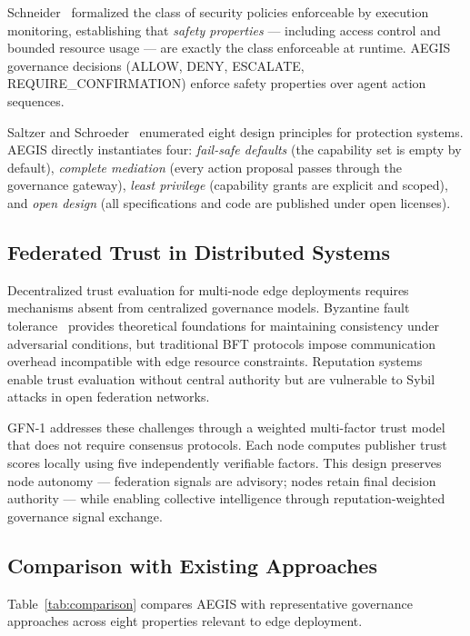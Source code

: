 \documentclass[journal]{IEEEtran}
\begin{document}
Schneider~\cite{schneider2000} formalized the class of security policies enforceable by execution monitoring, establishing that \textit{safety properties} --- including access control and bounded resource usage --- are exactly the class enforceable at runtime. AEGIS governance decisions (ALLOW, DENY, ESCALATE, REQUIRE\_CONFIRMATION) enforce safety properties over agent action sequences.

Saltzer and Schroeder~\cite{saltzer1975} enumerated eight design principles for protection systems. AEGIS directly instantiates four: \textit{fail-safe defaults} (the capability set is empty by default), \textit{complete mediation} (every action proposal passes through the governance gateway), \textit{least privilege} (capability grants are explicit and scoped), and \textit{open design} (all specifications and code are published under open licenses).

\subsection{Federated Trust in Distributed Systems}

Decentralized trust evaluation for multi-node edge deployments requires mechanisms absent from centralized governance models. Byzantine fault tolerance~\cite{castro1999} provides theoretical foundations for maintaining consistency under adversarial conditions, but traditional BFT protocols impose communication overhead incompatible with edge resource constraints. Reputation systems~\cite{josang2007} enable trust evaluation without central authority but are vulnerable to Sybil attacks in open federation networks.

GFN-1 addresses these challenges through a weighted multi-factor trust model that does not require consensus protocols. Each node computes publisher trust scores locally using five independently verifiable factors. This design preserves node autonomy --- federation signals are advisory; nodes retain final decision authority --- while enabling collective intelligence through reputation-weighted governance signal exchange.

\subsection{Comparison with Existing Approaches}

Table~\ref{tab:comparison} compares AEGIS with representative governance approaches across eight properties relevant to edge deployment.
\end{document}
